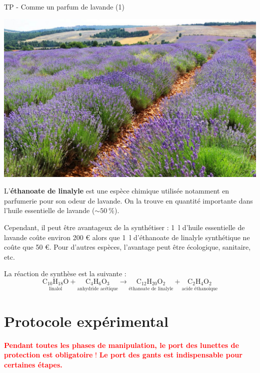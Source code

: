 \documentclass[12pt,a4paper,fleqn]{article}
\begin{document}
\normalem %

\begin{header}
TP - Comme un parfum de lavande (1)
\end{header}

\begin{multicols}{2}
\begin{center}
\includegraphics[width=\linewidth]{images/lavande.jpg}
\end{center}

L'\textbf{éthanoate de linalyle} est une espèce chimique utilisée notamment en parfumerie pour son odeur de lavande.
On la trouve en quantité importante dans l'huile essentielle de lavande ($\sim \qty{50}{\percent}$).

Cependant, il peut être avantageux de la synthétiser : \qty{1}{\litre} d'huile essentielle de lavande coûte environ 200 € alors que \qty{1}{\litre} d'éthanoate de linalyle synthétique ne coûte que 50 €.
Pour d'autres espèces, l'avantage peut être écologique, sanitaire, etc.
\end{multicols}

La réaction de synthèse est la suivante :
\[
\mathrm{ \underset{\text{linalol}}{C_{10}H_{18}O} + \underset{\text{anhydride acétique}}{C_4H_6O_3} \rightarrow \underset{\text{éthanoate de linalyle}}{C_{12}H_{20}O_2} + \underset{\text{acide éthanoïque}}{C_2H_4O_2}}
\]

\section*{Protocole expérimental}

\textcolor{red}{
\textbf{Pendant toutes les phases de manipulation, le port des lunettes de protection est obligatoire} !
\textbf{Le port des gants est indispensable pour certaines étapes.}
}
\end{document}
